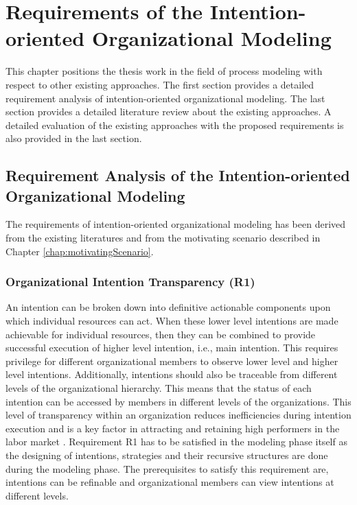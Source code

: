 \chapter{Requirements of the Intention-oriented Organizational Modeling}
\label{chap:analysis}
This chapter positions the thesis work in the field of process modeling with respect to other existing approaches. The first section provides a detailed requirement analysis of intention-oriented organizational modeling. The last section provides a detailed literature review about the existing approaches. A detailed evaluation of the existing approaches with the proposed requirements is also provided in the last section.

\section{Requirement Analysis of the Intention-oriented Organizational Modeling}
\label{sec:requirementssupoorting}
The requirements of intention-oriented organizational modeling has been derived from the existing literatures \cite{McManus2007, Mandic2010,Bleistein2006, Lacom, Brambilla2012} and from the motivating scenario described in Chapter \ref{chap:motivatingScenario}. 

\subsection{Organizational Intention Transparency (R1)}
An intention can be broken down into definitive actionable components upon which individual resources can act. When these lower level intentions are made achievable for individual resources, then they can be combined to provide successful execution of higher level intention, i.e., main intention. This requires privilege for different organizational members to observe lower level and higher level intentions. Additionally, intentions should also be traceable from different levels of the organizational hierarchy. This means that the status of each intention can be accessed by members in different levels of the organizations. This level of transparency within an organization reduces inefficiencies during intention execution and is a key factor in attracting and retaining high performers in the labor market \cite{McManus2007}. Requirement R1 has to be satisfied in the modeling phase itself as the designing of intentions, strategies and their recursive structures are done during the modeling phase. The prerequisites to satisfy this requirement are, intentions can be refinable and organizational members can view intentions at different levels. 

